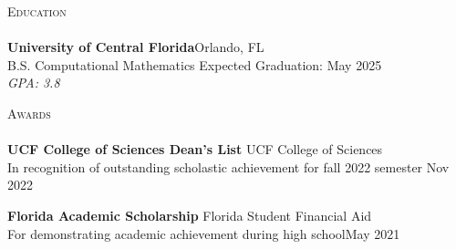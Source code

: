 \documentclass[letterpaper]{article}
\newcommand{\lineunder} {
    \vspace*{-8pt} \\
    \hspace*{-18pt} \hrulefill \\
}
\newcommand{\header} [1] {
    {\hspace*{-18pt}\vspace*{12pt} \large\textsc{#1}}
    \vspace*{-12pt} \lineunder
}
\begin{document}
\header{Education}
\textbf{University of Central Florida}\hfill Orlando, FL\\
B.S. Computational Mathematics \hfill Expected Graduation: May 2025\\
\hspace{7mm} \textit{GPA: 3.8}\\
\vspace{3mm}


\header{Awards}

\textbf{UCF College of Sciences Dean's List} \hfill UCF College of Sciences\\
In recognition of outstanding scholastic achievement for fall 2022 semester \hfill Nov 2022\\
\vspace*{2mm}

\textbf{Florida Academic Scholarship} \hfill Florida Student Financial Aid\\
For demonstrating academic achievement during high school\hfill May 2021\\
\end{document}
